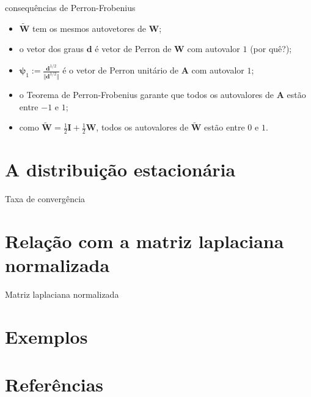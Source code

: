 \documentclass{beamer}
\begin{document}
\begin{frame}{consequências de Perron-Frobenius}
    \begin{itemize}
        \item \(\widetilde{\mathbf{W}}\) tem os mesmos autovetores de \(\mathbf{W}\);
        \item o vetor dos graus \(\mathbf{d}\) é \alert{vetor de Perron} de \(\mathbf{W}\) com autovalor \(1\) (por quê?);
        \item \(\mathbf{\psi}_1 := \frac{\mathbf{d}^{1/2}}{\Vert \mathbf{d}^{1/2} \Vert}\) é o vetor de Perron unitário de \(\mathbf{A}\) com autovalor \(1\);
        \item o Teorema de Perron-Frobenius garante que todos os autovalores de \(\mathbf{A}\) estão entre \(-1\) e \(1\);
        \item como \(\widetilde{\mathbf{W}} = \frac{1}{2}\mathbf{I} + \frac{1}{2}\mathbf{W}\), todos os autovalores de \(\widetilde{\mathbf{W}}\) estão entre \(0\) e \(1\).
    \end{itemize}
\end{frame}

\section{A distribuição estacionária}

\begin{frame}
    
\end{frame}

\begin{frame}{Taxa de convergência}
    
\end{frame}

\section{Relação com a matriz laplaciana normalizada}

\begin{frame}{Matriz laplaciana normalizada}
    
\end{frame}

\begin{frame}
    
\end{frame}

\begin{frame}
    
\end{frame}

\section{Exemplos}


\section*{Referências}

\begin{frame}
    \printbibliography
\end{frame}
\end{document}
